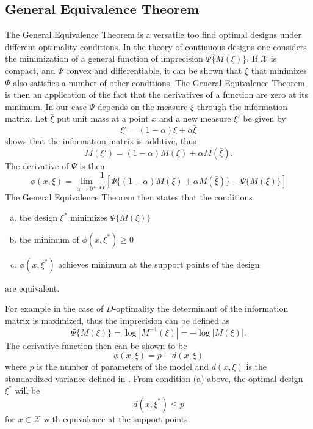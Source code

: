 \documentclass[12pt]{iopart}
\begin{document}
\subsection{General Equivalence Theorem}
\label{sec:get}
The General Equivalence Theorem is a versatile too find optimal designs under different optimality conditions. In the theory of continuous designs one considers the minimization of a general function of imprecision $\Psi\{M(\xi)\}$. If $\mathcal{X}$ is compact, and $\Psi$ convex and differentiable, it can be shown that $\xi$ that minimizes $\Psi$ also satisfies a number of other conditions. 
The General Equivalence Theorem is then an application of the fact that the derivatives of a function are zero at its minimum. In our case $\Psi$ depends on the measure $\xi$ through the information matrix. Let $\bar \xi$ put unit mass at a point $x$ and a new measure $\xi'$ be given by
\begin{equation}
\xi' = (1-\alpha)\xi + \alpha \bar \xi
\end{equation}
 shows that the information matrix is additive, thus
\begin{equation}
M(\xi') = (1-\alpha)M(\xi) + \alpha M(\bar \xi).
\end{equation}
The derivative of $\Psi$ is then
\begin{equation}
\phi(x, \xi) = \lim_{\alpha \rightarrow 0^+} \frac{1}{\alpha}\left[\Psi\{(1-\alpha)M(\xi) + \alpha M(\bar \xi)\} - \Psi\{M(\xi)\}\right]
\label{eq:deriv}
\end{equation}
The General Equivalence Theorem then states that the conditions
\begin{enumerate}[(a)]
\item the design $\xi^*$ minimizes $\Psi\{M(\xi)\}$
\item the minimum of $\phi(x, \xi^*) \geq 0$
\item $\phi(x, \xi^*)$ achieves minimum at the support points of the design
\end{enumerate}
are equivalent. 

For example in the case of $D$-optimality the determinant of the information matrix is maximized, thus the imprecision can be defined as
\begin{equation}
\Psi\{M(\xi)\} = \log|M^{-1}(\xi)| = - \log|M(\xi)|.
\end{equation}
The derivative function  then can be shown to be
\begin{equation}
\phi(x, \xi) = p - d(x, \xi)
\label{eq:phicond}
\end{equation}
where $p$ is the number of parameters of the model and $d(x, \xi)$ is the standardized variance defined in . From condition (a) above, the optimal design $\xi^*$ will be 
\begin{equation}
d(x, \xi^*) \leq p
\end{equation}
for $x \in \mathcal{X}$ with equivalence at the support points.
\end{document}
